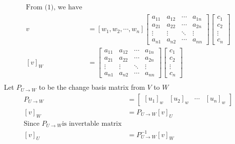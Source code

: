 \documentclass[10pt]{article}
\begin{document}
\begin{equation} 
\begin{aligned}
        \mbox{From (1), we have} \\
        v &=
        \left[w_1, w_2, \cdots, w_n \right]
        \begin{bmatrix}
        a_{11} & a_{12} & \cdots & a_{1n} \\
        a_{21} & a_{22} & \cdots & a_{2n} \\
        \vdots  & \vdots  & \ddots & \vdots  \\
        a_{n1} & a_{n2} & \cdots & a_{nn} 
        \end{bmatrix}
        \left[ \begin{array}{cc} 
        c_1 \\
        c_2 \\
        \vdots \\
        c_n
        \end{array} 
        \right] \\
        \left[ v \right]_{\scriptscriptstyle{W}} &=
        \begin{bmatrix}
        a_{11} & a_{12} & \cdots & a_{1n} \\
        a_{21} & a_{22} & \cdots & a_{2n} \\
        \vdots  & \vdots  & \ddots & \vdots  \\
        a_{n1} & a_{n2} & \cdots & a_{nn} 
        \end{bmatrix}
        \left[ \begin{array}{cc} 
        c_1 \\
        c_2 \\
        \vdots \\
        c_n
        \end{array} 
        \right] \\
\end{aligned}
\end{equation}
Let $P_{ \scriptscriptstyle{U} \rightarrow \scriptscriptstyle{W}}$ to be the change basis matrix from $V$ to $W$ \\ 
\begin{equation} 
\begin{aligned}
        P_{ \scriptscriptstyle{U} \rightarrow \scriptscriptstyle{W} } &= 
        \begin{bmatrix}
        \left[ u_1 \right]_{w} &\left[ u_2 \right]_{w} & \cdots & \left[ u_n \right]_{w}    
        \end{bmatrix} \\
        \left[ v \right]_{\scriptscriptstyle{W}} &=
        P_{ \scriptscriptstyle{U} \rightarrow \scriptscriptstyle{W} } 
        \left[  v \right]_{\scriptscriptstyle{U}}  \\
        \text{Since } P_{ \scriptscriptstyle{U} \rightarrow \scriptscriptstyle{W} } \mbox{is invertable matrix} \\ 
        \left[  v \right]_{\scriptscriptstyle{U}} &= P_{ \scriptscriptstyle{U} \rightarrow \scriptscriptstyle{W}}^{-1} \left[ v \right]_{\scriptscriptstyle{W}} \nonumber
\end{aligned} 
\end{equation} 
\end{document}
